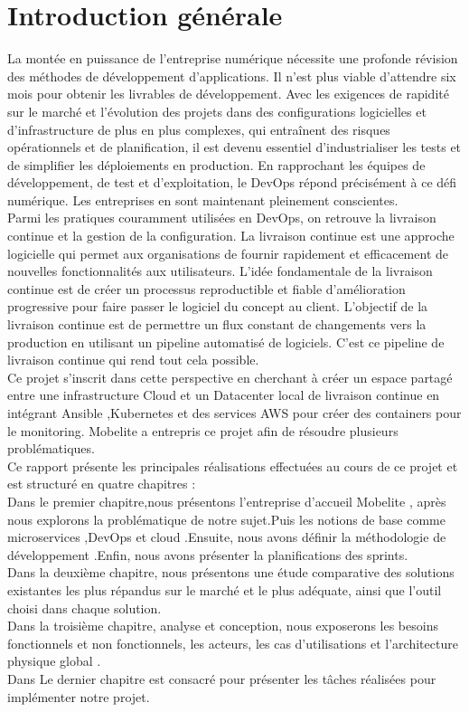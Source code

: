 \chapter*{Introduction générale}
\label{chap:introduction}
\textsf{\selectfont{}La montée en puissance de l'entreprise numérique nécessite une profonde révision des méthodes de développement d'applications. Il n'est plus viable d'attendre six mois pour obtenir les livrables de développement. Avec les exigences de rapidité sur le marché et l'évolution des projets dans des configurations logicielles et d'infrastructure de plus en plus complexes, qui entraînent des risques opérationnels et de planification, il est devenu essentiel d'industrialiser les tests et de simplifier les déploiements en production. En rapprochant les équipes de développement, de test et d'exploitation, le DevOps répond précisément à ce défi numérique. Les entreprises en sont maintenant pleinement conscientes.\\[1cm]
Parmi les pratiques couramment utilisées en DevOps, on retrouve la livraison continue et la gestion de la configuration. La livraison continue est une approche logicielle qui permet aux organisations de fournir rapidement et efficacement de nouvelles fonctionnalités aux utilisateurs. L'idée fondamentale de la livraison continue est de créer un processus reproductible et fiable d'amélioration progressive pour faire passer le logiciel du concept au client. L'objectif de la livraison continue est de permettre un flux constant de changements vers la production en utilisant un pipeline automatisé de logiciels. C'est ce pipeline de livraison continue qui rend tout cela possible.\\[1cm]
Ce projet s'inscrit dans cette perspective en cherchant à  créer un espace partagé entre une infrastructure Cloud et un Datacenter local de livraison continue en intégrant Ansible ,Kubernetes et des services AWS pour créer des containers pour le monitoring. Mobelite a entrepris ce projet afin de résoudre plusieurs problématiques.\\[1cm]
Ce rapport présente les principales réalisations effectuées au cours de ce projet et est structuré en quatre chapitres :\\[1cm]
Dans le premier chapitre,nous présentons l’entreprise d’accueil Mobelite , après nous explorons la problématique de notre sujet.Puis les notions de base comme microservices ,DevOps et cloud .Ensuite, nous avons définir la méthodologie de développement .Enfin, nous avons présenter la planifications des sprints.\\[1cm]
Dans la deuxième chapitre, nous présentons une étude comparative des solutions existantes  les
plus répandus sur le marché et le plus adéquate, ainsi que l’outil choisi dans chaque solution.\\[1cm]
Dans la troisième chapitre, analyse et conception,  nous exposerons les besoins
fonctionnels et non fonctionnels, les acteurs, les cas d’utilisations et l’architecture physique global .\\[1cm]
Dans Le dernier chapitre est consacré pour présenter les tâches réalisées pour implémenter notre
projet.
}